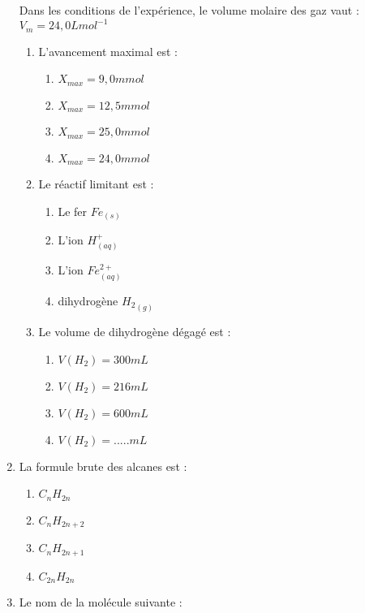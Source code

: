 \documentclass[12pt]{article}
\begin{document}
\begin{multicols}{2}
\begin{enumerate}
			Dans les conditions de l’expérience, le volume molaire des gaz vaut : $V_m = 24,0Lmol^{-1}$
			\begin{enumerate}
				\item L’avancement maximal est : 
					\begin{enumerate}
						\item $X_{max} = 9,0mmol$
						\item $X_{max} = 12,5mmol$
						\item $X_{max} = 25,0mmol$
						\item $X_{max} = 24,0mmol$
					\end{enumerate}
				\item Le réactif limitant est :  
					\begin{enumerate}
						\item Le fer $Fe_{(s)}$
						\item L’ion $H^+_{(aq)}$
						\item L’ion $Fe^{2+}_{(aq)}$
					\item dihydrogène ${H_2}_{(g)}$
					\end{enumerate}
				\item Le volume de dihydrogène dégagé est : 
					\begin{enumerate}
						\item $V (H_2) = 300 mL$
						\item $V (H_2) = 216 mL$
						\item $V (H_2) = 600 mL$
						\item $V (H_2) =  .....  mL$
					\end{enumerate}
			\end{enumerate}
		\item La formule brute des alcanes est : 
			\begin{enumerate}
				\item $C_nH_{2n}$
				\item $C_nH_{2n+2}$
				\item $C_nH_{2n+1}$
				\item $C_{2n}H_{2n}$
			\end{enumerate}
		\item Le nom de la molécule suivante : 


\end{enumerate}
\end{multicols}
\end{document}
